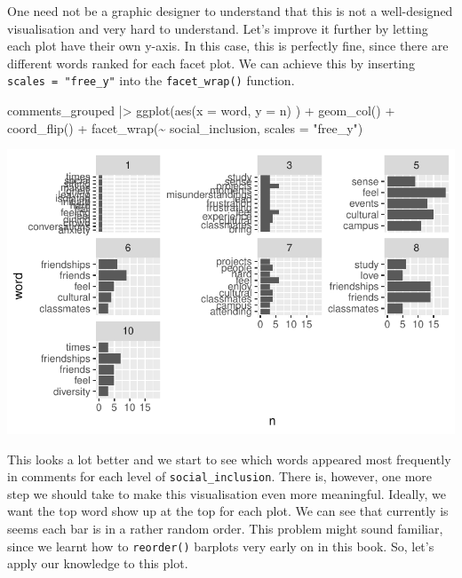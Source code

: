\documentclass[
  letterpaper,
]{krantz}
\makeatletter
\newenvironment{Shaded}{\begin{snugshade}}{\end{snugshade}}
\newcommand{\AttributeTok}[1]{\textcolor[rgb]{0.40,0.45,0.13}{#1}}
\newcommand{\FunctionTok}[1]{\textcolor[rgb]{0.28,0.35,0.67}{#1}}
\newcommand{\NormalTok}[1]{\textcolor[rgb]{0.00,0.23,0.31}{#1}}
\newcommand{\SpecialCharTok}[1]{\textcolor[rgb]{0.37,0.37,0.37}{#1}}
\newcommand{\StringTok}[1]{\textcolor[rgb]{0.13,0.47,0.30}{#1}}
\newenvironment{kframe}{%
\medskip{}
\setlength{\fboxsep}{.8em}
 \def\at@end@of@kframe{}%
 \ifinner\ifhmode%
  \def\at@end@of@kframe{\end{minipage}}%
  \begin{minipage}{\columnwidth}%
 \fi\fi%
 \def\FrameCommand##1{\hskip\@totalleftmargin \hskip-\fboxsep
 \colorbox{shadecolor}{##1}\hskip-\fboxsep
     \hskip-\linewidth \hskip-\@totalleftmargin \hskip\columnwidth}%
 \MakeFramed {\advance\hsize-\width
   \@totalleftmargin\z@ \linewidth\hsize
   \@setminipage}}%
 {\par\unskip\endMakeFramed%
 \at@end@of@kframe}
\renewenvironment{Shaded}{\begin{kframe}}{\end{kframe}}
\makeatother
\begin{document}
One need not be a graphic designer to understand that this is not a
well-designed visualisation and very hard to understand. Let's improve
it further by letting each plot have their own y-axis. In this case,
this is perfectly fine, since there are different words ranked for each
facet plot. We can achieve this by inserting
\texttt{scales\ =\ "free\_y"} into the \texttt{facet\_wrap()} function.

\begin{Shaded}
\begin{Highlighting}[]
\NormalTok{comments\_grouped }\SpecialCharTok{|\textgreater{}}
  \FunctionTok{ggplot}\NormalTok{(}\FunctionTok{aes}\NormalTok{(}\AttributeTok{x =}\NormalTok{ word,}
             \AttributeTok{y =}\NormalTok{ n)}
\NormalTok{         ) }\SpecialCharTok{+}
  \FunctionTok{geom\_col}\NormalTok{() }\SpecialCharTok{+}
  \FunctionTok{coord\_flip}\NormalTok{() }\SpecialCharTok{+}
  \FunctionTok{facet\_wrap}\NormalTok{(}\SpecialCharTok{\textasciitilde{}}\NormalTok{ social\_inclusion,}
             \AttributeTok{scales =} \StringTok{"free\_y"}\NormalTok{)}
\end{Highlighting}
\end{Shaded}

\includegraphics{14_mixed_methods_files/figure-pdf/visualise-social-inclusion-groups-words-n-02-1.pdf}

This looks a lot better and we start to see which words appeared most
frequently in comments for each level of \texttt{social\_inclusion}.
There is, however, one more step we should take to make this
visualisation even more meaningful. Ideally, we want the top word show
up at the top for each plot. We can see that currently is seems each bar
is in a rather random order. This problem might sound familiar, since we
learnt how to \texttt{reorder()} barplots very early on in this book.
So, let's apply our knowledge to this plot.
\end{document}
